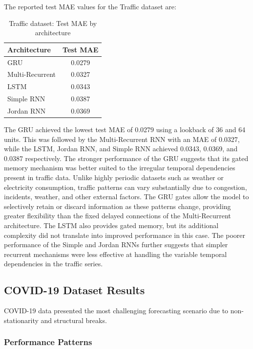 \documentclass[conference]{IEEEtran}
\begin{document}
The reported test MAE values for the Traffic dataset are:

\begin{table}[H]
\centering
\caption{Traffic dataset: Test MAE by architecture}
\label{tab:traffic_results}
\begin{tabular}{lc}
\toprule
\textbf{Architecture} & \textbf{Test MAE} \\
\midrule
GRU & 0.0279 \\
Multi-Recurrent & 0.0327 \\
LSTM & 0.0343 \\
Simple RNN & 0.0387 \\
Jordan RNN & 0.0369 \\
\bottomrule
\end{tabular}
\end{table}

The GRU achieved the lowest test MAE of 0.0279 using a lookback of 36
and 64 units. This was followed by the Multi-Recurrent RNN with an MAE
of 0.0327, while the LSTM, Jordan RNN, and Simple RNN achieved 0.0343,
0.0369, and 0.0387 respectively. The stronger performance of the GRU
suggests that its gated memory mechanism was better suited to the irregular
temporal dependencies present in traffic data. Unlike highly periodic datasets
such as weather or electricity consumption, traffic patterns can vary substantially
due to congestion, incidents, weather, and other external factors. The
GRU gates allow the model to selectively retain or discard information as
these patterns change, providing greater flexibility than the fixed delayed
connections of the Multi-Recurrent architecture. The LSTM also provides gated
memory, but its additional complexity did not translate into improved performance
in this case. The poorer performance of the Simple and Jordan RNNs further
suggests that simpler recurrent mechanisms were less effective at handling the
variable temporal dependencies in the traffic series.

\subsection{COVID-19 Dataset Results}

COVID-19 data presented the most challenging forecasting scenario due to non-stationarity and structural breaks.

\subsubsection{Performance Patterns}
\end{document}
